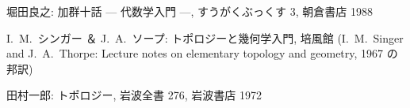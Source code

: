 \documentclass[12pt,twoside]{jarticle}
\begin{document}
\begin{thebibliography}{ABC}




堀田良之: 加群十話 --- 代数学入門 ---, すうがくぶっくす 3, 
朝倉書店 1988 






I.~M.~シンガー ＆ J.~A.~ソープ: トポロジーと幾何学入門, 培風館 
(I.~M.~Singer and J.~A.~Thorpe: Lecture notes on elementary topology
and geometry, 1967 の邦訳)


田村一郎: トポロジー, 岩波全書 276, 岩波書店 1972

\end{thebibliography}

\end{document}
